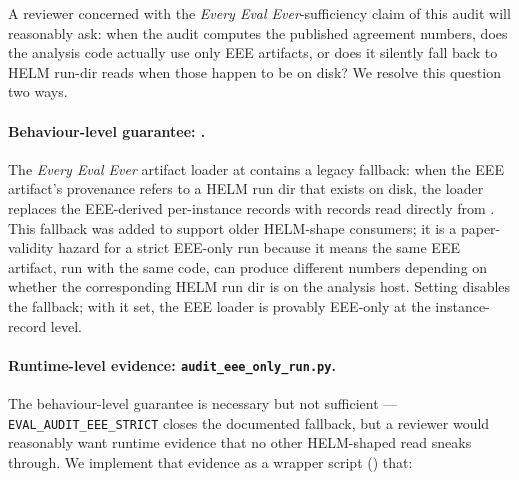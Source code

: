 \documentclass[11pt]{article}
\newcommand{\eee}{\textit{Every Eval Ever}\xspace}
\begin{document}
A reviewer concerned with the \eee{}-sufficiency claim of this audit
  will reasonably ask: when the audit computes the published agreement
  numbers, does the analysis code actually use only EEE artifacts, or
  does it silently fall back to HELM run-dir reads when those happen
  to be on disk?
We resolve this question two ways.

\paragraph{Behaviour-level guarantee: .}
The \eee{} artifact loader at
   contains a legacy
  fallback: when the EEE artifact's provenance refers to a HELM run
  dir that exists on disk, the loader replaces the EEE-derived
  per-instance records with records read directly from
  .
This fallback was added to support older HELM-shape consumers; it is
  a paper-validity hazard for a strict EEE-only run because it means
  the same EEE artifact, run with the same code, can produce
  different numbers depending on whether the corresponding HELM run
  dir is on the analysis host.
Setting  disables the fallback;
  with it set, the EEE loader is provably EEE-only at the
  instance-record level.

\paragraph{Runtime-level evidence: \texttt{audit\_eee\_only\_run.py}.}
The behaviour-level guarantee is necessary but not sufficient ---
  \texttt{EVAL\_AUDIT\_EEE\_STRICT} closes the documented fallback,
  but a reviewer would reasonably want runtime evidence that no other
  HELM-shaped read sneaks through.
We implement that evidence as a wrapper script
  () that:
\end{document}
